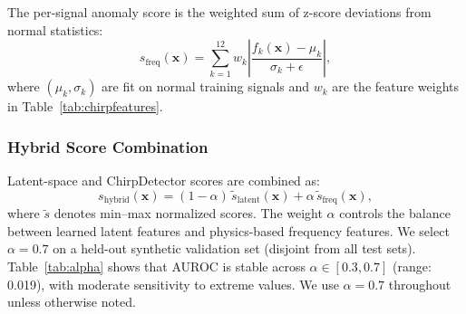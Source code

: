 \documentclass[conference]{IEEEtran}
\begin{document}
\begin{table}[t]
\caption{ChirpDetector features (12 total). Weights reflect discriminative importance determined on a validation set.}
\label{tab:chirpfeatures}
\centering
{}
\end{table}

The per-signal anomaly score is the weighted sum of z-score deviations from normal statistics:
\begin{equation}
s_{\mathrm{freq}}(\mathbf{x}) = \sum_{k=1}^{12} w_k \left|\frac{f_k(\mathbf{x}) - \mu_k}{\sigma_k + \epsilon}\right|,
\end{equation}
where $(\mu_k, \sigma_k)$ are fit on normal training signals and $w_k$ are the feature weights in Table~\ref{tab:chirpfeatures}.

\subsubsection{Hybrid Score Combination}
Latent-space and ChirpDetector scores are combined as:
\begin{equation}
 s_{\mathrm{hybrid}}(\mathbf{x}) = (1-\alpha)\,\tilde{s}_{\mathrm{latent}}(\mathbf{x}) + \alpha\,\tilde{s}_{\mathrm{freq}}(\mathbf{x}),
\end{equation}
where $\tilde{s}$ denotes min--max normalized scores. The weight $\alpha$ controls the balance between learned latent features and physics-based frequency features. We select $\alpha=0.7$ on a held-out synthetic validation set (disjoint from all test sets). Table~\ref{tab:alpha} shows that AUROC is stable across $\alpha \in [0.3, 0.7]$ (range: 0.019), with moderate sensitivity to extreme values. We use $\alpha=0.7$ throughout unless otherwise noted.
\end{document}
